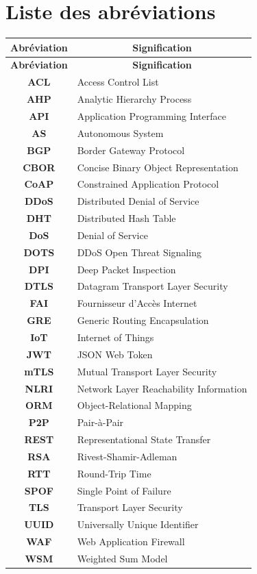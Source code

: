 \chapter*{Liste des abréviations}

\begin{center}
\renewcommand{\arraystretch}{1.4}
\begin{longtable}{|>{\bfseries}c|l|}
\hline
\textbf{Abréviation} & \multicolumn{1}{c|}{\textbf{Signification}} \\
\hline
\endfirsthead
\hline
\textbf{Abréviation} & \multicolumn{1}{c|}{\textbf{Signification}} \\
\hline
\endhead
\hline
\endfoot
ACL   & Access Control List \\
\hline
AHP   & Analytic Hierarchy Process \\
\hline
API   & Application Programming Interface \\
\hline
AS    & Autonomous System \\
\hline
BGP   & Border Gateway Protocol \\
\hline
CBOR  & Concise Binary Object Representation \\
\hline
CoAP  & Constrained Application Protocol \\
\hline
DDoS  & Distributed Denial of Service \\
\hline
DHT   & Distributed Hash Table \\
\hline
DoS   & Denial of Service \\
\hline
DOTS  & DDoS Open Threat Signaling \\
\hline
DPI   & Deep Packet Inspection \\
\hline
DTLS  & Datagram Transport Layer Security \\
\hline
FAI   & Fournisseur d'Accès Internet \\
\hline
GRE   & Generic Routing Encapsulation \\
\hline
IoT   & Internet of Things \\
\hline
JWT   & JSON Web Token \\
\hline
mTLS  & Mutual Transport Layer Security \\
\hline
NLRI  & Network Layer Reachability Information \\
\hline
ORM   & Object-Relational Mapping \\
\hline
P2P   & Pair-à-Pair \\
\hline
REST  & Representational State Transfer \\
\hline
RSA   & Rivest-Shamir-Adleman \\
\hline
RTT   & Round-Trip Time \\
\hline
SPOF  & Single Point of Failure \\
\hline
TLS   & Transport Layer Security \\
\hline
UUID  & Universally Unique Identifier \\
\hline
WAF   & Web Application Firewall \\
\hline
WSM   & Weighted Sum Model \\
\hline
\end{longtable}
\end{center}
